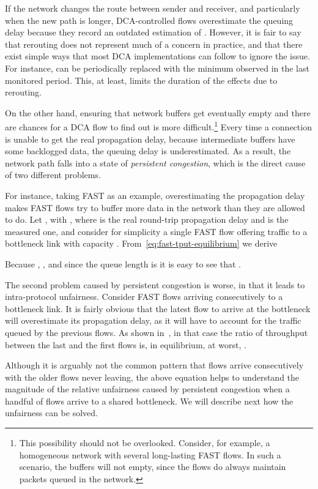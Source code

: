 \documentclass[english,times]{ettauth}
\begin{document}
If the network changes the route between sender and receiver, and particularly
when the new path is longer, DCA-controlled flows overestimate the queuing
delay because they record an outdated estimation of . However, it is fair
to say that rerouting does not represent much of a concern in practice, and
that there exist simple ways that most DCA implementations can follow to
ignore the issue. For instance,  can be periodically replaced with the
minimum observed  in the last monitored period. This, at least, limits the
duration of the effects due to rerouting.

On the other hand, ensuring that network buffers get eventually empty and
there are chances for a DCA flow to find out  is more
difficult.\footnote{This possibility should not be overlooked. Consider, for
  example, a homogeneous network with several long-lasting FAST flows. In such
  a scenario, the buffers will not empty, since the flows do always maintain
   packets queued in the network.} Every time a connection is unable
to get the real propagation delay, because intermediate buffers have some
backlogged data, the queuing delay is underestimated. As a result, the network
path falls into a state of \emph{persistent congestion}, which is the direct
cause of two different problems.

For instance, taking FAST as an example, overestimating the propagation delay
makes FAST flows try to buffer more data in the network than they are allowed
to do. Let , with , where  is the real round-trip
propagation delay and  is the measured one, and consider for
simplicity a single FAST flow offering traffic to a bottleneck link with
capacity . From~\eqref{eq:fast-tput-equilibrium} we derive

Because , , and since the queue length is
 it is easy to see that .


The second problem caused by persistent congestion is worse, in that it leads
to intra-protocol unfairness. Consider  FAST flows arriving consecutively
to a bottleneck link. It is fairly obvious that the latest flow to arrive at
the bottleneck will overestimate its propagation delay, as it will have to
account for the traffic queued by the previous flows. As shown
in~\cite{Rperez10}, in that case the ratio of throughput between the last and
the first flows is, in equilibrium, at worst, .

Although it is arguably not the common pattern that flows arrive consecutively
with the older flows never leaving, the above equation helps to understand the
magnitude of the relative unfairness caused by persistent congestion when a
handful of flows arrive to a shared bottleneck. We will describe next how the
unfairness can be solved.
\end{document}
